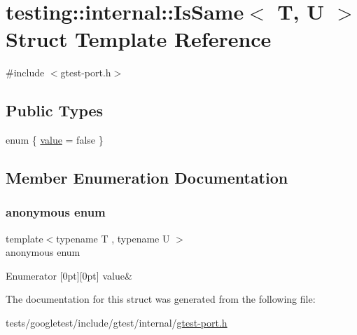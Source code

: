 \hypertarget{structtesting_1_1internal_1_1IsSame}{}\section{testing\+:\+:internal\+:\+:Is\+Same$<$ T, U $>$ Struct Template Reference}
\label{structtesting_1_1internal_1_1IsSame}


{\ttfamily \#include $<$gtest-\/port.\+h$>$}

\subsection*{Public Types}
\begin{DoxyCompactItemize}
\item 
enum \{ \hyperlink{structtesting_1_1internal_1_1IsSame_acebf1dabd866eb05f295125a4991d9baa58968a8c680eff4326a25fab55aa0a5e}{value} = false
 \}
\end{DoxyCompactItemize}


\subsection{Member Enumeration Documentation}
\mbox{\label{structtesting_1_1internal_1_1IsSame_acebf1dabd866eb05f295125a4991d9ba}} 
\subsubsection{\texorpdfstring{anonymous enum}{anonymous enum}}
{\footnotesize\ttfamily template$<$typename T , typename U $>$ \\
anonymous enum}

\begin{DoxyEnumFields}{Enumerator}
[0pt][0pt]{}\mbox{\label{structtesting_1_1internal_1_1IsSame_acebf1dabd866eb05f295125a4991d9baa58968a8c680eff4326a25fab55aa0a5e}} 
value&\\
\hline

\end{DoxyEnumFields}


The documentation for this struct was generated from the following file\+:\begin{DoxyCompactItemize}
\item 
tests/googletest/include/gtest/internal/\hyperlink{gtest-port_8h}{gtest-\/port.\+h}\end{DoxyCompactItemize}
